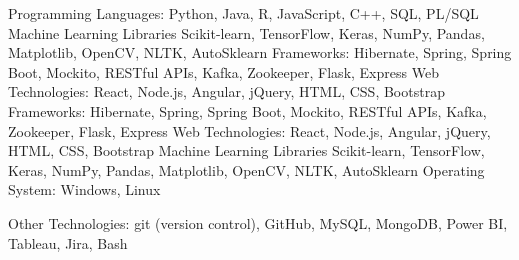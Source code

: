 \begin{cvskills}
  \cvskill
    {Programming Languages:}
    {Python, Java, R, JavaScript,  C++, SQL, PL/SQL}
  {
  \cvskill
    {Machine Learning Libraries}
    {Scikit-learn, TensorFlow, Keras, NumPy, Pandas, Matplotlib, OpenCV, NLTK, AutoSklearn}
  \cvskill
    {Frameworks:}
    {Hibernate, Spring, Spring Boot, Mockito, RESTful APIs, Kafka, Zookeeper, Flask, Express}
  \cvskill
    {Web Technologies:}
    {React, Node.js, Angular, jQuery, HTML, CSS, Bootstrap}
  }
  {
  \cvskill
    {Frameworks:}
    {Hibernate, Spring, Spring Boot, Mockito, RESTful APIs, Kafka, Zookeeper, Flask, Express}
  \cvskill
    {Web Technologies:}
    {React, Node.js, Angular, jQuery, HTML, CSS, Bootstrap}
  \cvskill
    {Machine Learning Libraries}
    {Scikit-learn, TensorFlow, Keras, NumPy, Pandas, Matplotlib, OpenCV, NLTK, AutoSklearn}
  }
  \cvskill
    {Operating System:}
    {Windows,  Linux}
  
    
   
   \cvskill
    {Other Technologies:}
    {git (version control), GitHub, MySQL, MongoDB, Power BI, Tableau, Jira, Bash}
\end{cvskills}